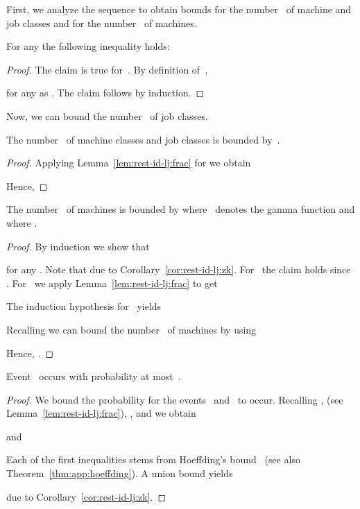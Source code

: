 \documentclass[a4paper,11pt,fleqn]{article}
\begin{document}
First, we analyze the sequence  to obtain bounds for the number~ of machine and job classes and for the number~ of machines.

\begin{lemma}
\label{lem:rest-id-lj:frac}
For any  the following inequality holds:

\end{lemma}

\begin{proof}
The claim is true for~. By definition of~,

for any  as . The claim follows by induction.
\end{proof}

Now, we can bound the number~ of job classes.

\begin{cor}
\label{cor:rest-id-lj:zk}
The number~ of machine classes and job classes is bounded by~.
\end{cor}

\begin{proof}
Applying Lemma~\ref{lem:rest-id-lj:frac} for  we obtain

Hence,

\end{proof}

\begin{lemma}
\label{lem:rest-id-lj:m}
The number~ of machines is bounded by  where~ denotes the gamma function and where .
\end{lemma}

\begin{proof}
By induction we show that

for any . Note that  due to Corollary~\ref{cor:rest-id-lj:zk}. For~ the claim holds since . For~ we apply Lemma~\ref{lem:rest-id-lj:frac} to get

The induction hypothesis for~ yields

Recalling  we can bound the number~ of machines by using

Hence, .
\end{proof}

\begin{lemma}
\label{lem:rest-id-lj:succ-prob}
Event~ occurs with probability at most~.
\end{lemma}

\begin{proof}
We bound the probability for the events~ and~ to occur. Recalling ,  (see Lemma~\ref{lem:rest-id-lj:frac}), , and  we obtain

and

Each of the first inequalities stems from Hoeffding's bound~\cite{Hoeffding:1963} (see also Theorem~\ref{thm:app:hoeffding}). A union bound yields

due to Corollary~\ref{cor:rest-id-lj:zk}.
\end{proof}
\end{document}
